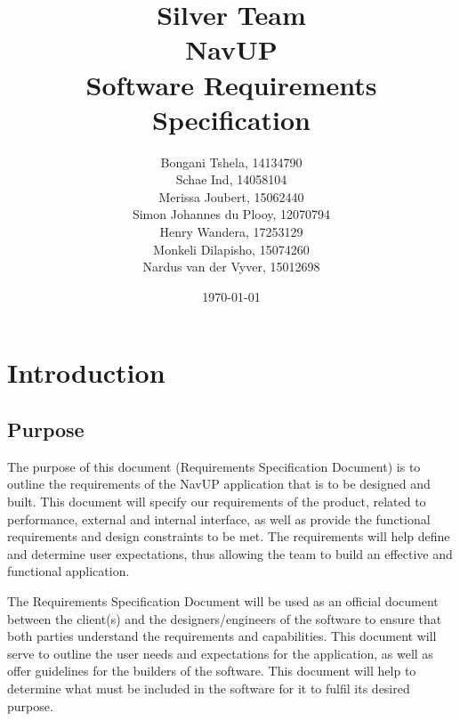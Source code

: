 \documentclass[12pt]{article}
\begin{document}
\title{\Huge Silver Team \\ NavUP \\ Software Requirements Specification}
\author{\Large Bongani Tshela, 14134790 \\
		\Large Schae Ind, 14058104 \\
		\Large Merissa Joubert, 15062440 \\
		\Large Simon Johannes du Plooy, 12070794 \\
		\Large Henry Wandera, 17253129 \\
		\Large Monkeli Dilapisho, 15074260 \\
		\Large Nardus van der Vyver, 15012698}
\date{\today}
\maketitle

\newpage
\tableofcontents
\newpage






\pagebreak

\section{Introduction}
	\subsection{Purpose}

	The purpose of this document (Requirements Specification Document) is to outline the requirements of the NavUP application that is to be designed and built. This document will specify our requirements of the product, related to performance, external and internal interface, as well as provide the functional requirements and design constraints to be met. The requirements will help define and determine user expectations, thus allowing the team to build an effective and functional application. 

\vspace{\baselineskip}
The Requirements Specification Document will be used as an official document between the client(s) and the designers/engineers of the software to ensure that both parties understand the requirements and capabilities. This document will serve to outline the user needs and expectations for the application, as well as offer guidelines for the builders of the software. This document will help to determine what must be included in the software for it to fulfil its desired purpose.
\end{document}
